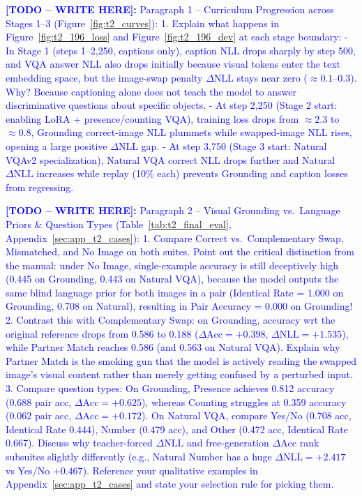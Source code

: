 \documentclass{article}
\newcommand{\writetodo}[1]{\noindent\textcolor{blue}{\textbf{[TODO -- WRITE HERE]:} #1}\par\medskip}
\begin{document}
\writetodo{Paragraph 1 -- Curriculum Progression across Stages 1--3 (Figure~\ref{fig:t2_curves}):
1. Explain what happens in Figure~\ref{fig:t2_196_loss} and Figure~\ref{fig:t2_196_dev} at each stage boundary:
   - In Stage 1 (steps 1--2,250, captions only), caption NLL drops sharply by step 500, and VQA answer NLL also drops initially because visual tokens enter the text embedding space, but the image-swap penalty $\Delta\text{NLL}$ stays near zero ($\approx 0.1$--$0.3$). Why? Because captioning alone does not teach the model to answer discriminative questions about specific objects.
   - At step 2,250 (Stage 2 start: enabling LoRA + presence/counting VQA), training loss drops from $\approx 2.3$ to $\approx 0.8$, Grounding correct-image NLL plummets while swapped-image NLL rises, opening a large positive $\Delta\text{NLL}$ gap.
   - At step 3,750 (Stage 3 start: Natural VQAv2 specialization), Natural VQA correct NLL drops further and Natural $\Delta\text{NLL}$ increases while replay (10\% each) prevents Grounding and caption losses from regressing.}

\writetodo{Paragraph 2 -- Visual Grounding vs.\ Language Priors & Question Types (Table~\ref{tab:t2_final_eval}, Appendix~\ref{sec:app_t2_cases}):
1. Compare Correct vs.\ Complementary Swap, Mismatched, and No Image on both suites. Point out the critical distinction from the manual: under No Image, single-example accuracy is still deceptively high (0.445 on Grounding, 0.443 on Natural VQA), because the model outputs the same blind language prior for both images in a pair (Identical Rate = 1.000 on Grounding, 0.708 on Natural), resulting in Pair Accuracy = 0.000 on Grounding!
2. Contrast this with Complementary Swap: on Grounding, accuracy wrt the original reference drops from 0.586 to 0.188 ($\Delta\text{Acc} = +0.398$, $\Delta\text{NLL} = +1.535$), while Partner Match reaches 0.586 (and 0.563 on Natural VQA). Explain why Partner Match is the smoking gun that the model is actively reading the swapped image's visual content rather than merely getting confused by a perturbed input.
3. Compare question types: On Grounding, Presence achieves 0.812 accuracy (0.688 pair acc, $\Delta\text{Acc}=+0.625$), whereas Counting struggles at 0.359 accuracy (0.062 pair acc, $\Delta\text{Acc}=+0.172$). On Natural VQA, compare Yes/No (0.708 acc, Identical Rate 0.444), Number (0.479 acc), and Other (0.472 acc, Identical Rate 0.667). Discuss why teacher-forced $\Delta\text{NLL}$ and free-generation $\Delta\text{Acc}$ rank subsuites slightly differently (e.g., Natural Number has a huge $\Delta\text{NLL}=+2.417$ vs Yes/No $+0.467$). Reference your qualitative examples in Appendix~\ref{sec:app_t2_cases} and state your selection rule for picking them.}
\end{document}
